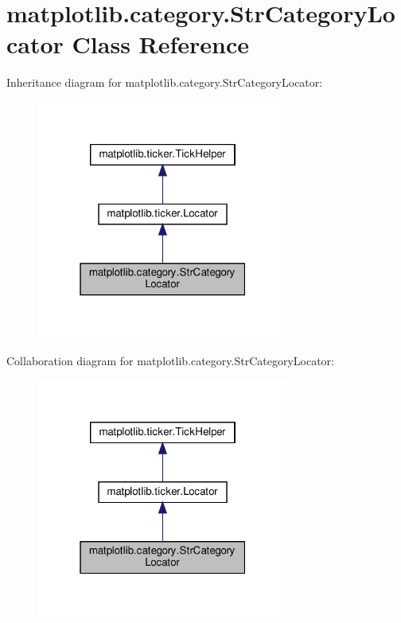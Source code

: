 \hypertarget{classmatplotlib_1_1category_1_1StrCategoryLocator}{}\section{matplotlib.\+category.\+Str\+Category\+Locator Class Reference}
\label{classmatplotlib_1_1category_1_1StrCategoryLocator}


Inheritance diagram for matplotlib.\+category.\+Str\+Category\+Locator\+:
\nopagebreak
\begin{figure}[H]
\begin{center}
\leavevmode
\includegraphics[width=235pt]{classmatplotlib_1_1category_1_1StrCategoryLocator__inherit__graph}
\end{center}
\end{figure}


Collaboration diagram for matplotlib.\+category.\+Str\+Category\+Locator\+:
\nopagebreak
\begin{figure}[H]
\begin{center}
\leavevmode
\includegraphics[width=235pt]{classmatplotlib_1_1category_1_1StrCategoryLocator__coll__graph}
\end{center}
\end{figure}
